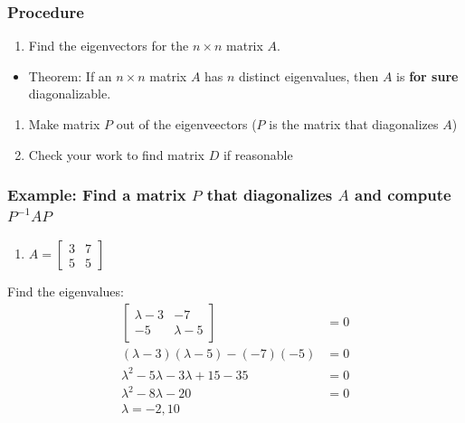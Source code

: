 \documentclass[
  letterpaper,
  DIV=11,
  numbers=noendperiod]{scrartcl}
\providecommand{\tightlist}{%
  \setlength{\itemsep}{0pt}\setlength{\parskip}{0pt}}\usepackage{longtable,booktabs,array}
\begin{document}
\subsubsection{Procedure}\label{procedure}

\begin{enumerate}
\def\labelenumi{\arabic{enumi}.}
\tightlist
\item
  Find the eigenvectors for the \(n \times n\) matrix \(A\).
\end{enumerate}

\begin{itemize}
\tightlist
\item
  Theorem: If an \(n \times n\) matrix \(A\) has \(n\) distinct
  eigenvalues, then \(A\) is \textbf{for sure} diagonalizable.
\end{itemize}

\begin{enumerate}
\def\labelenumi{\arabic{enumi}.}
\setcounter{enumi}{1}
\tightlist
\item
  Make matrix \(P\) out of the eigenveectors (\(P\) is the matrix that
  diagonalizes \(A\))
\item
  Check your work to find matrix \(D\) if reasonable
\end{enumerate}

\subsubsection{\texorpdfstring{Example: Find a matrix \(P\) that
diagonalizes \(A\) and compute
\(P^{-1}AP\)}{Example: Find a matrix P that diagonalizes A and compute P\^{}\{-1\}AP}}\label{example-find-a-matrix-p-that-diagonalizes-a-and-compute-p-1ap}

\begin{enumerate}
\def\labelenumi{\arabic{enumi}.}
\tightlist
\item
  \(A = \begin{bmatrix}3 & 7 \\ 5 & 5 \end{bmatrix}\)
\end{enumerate}

Find the eigenvalues: \begin{align*}
\begin{bmatrix}\lambda-3 & -7 \\ -5 & \lambda-5\end{bmatrix} &= 0 \\
(\lambda-3)(\lambda-5)-(-7)(-5) &= 0 \\
\lambda^2-5\lambda-3\lambda+15-35 &= 0 \\
\lambda^2-8\lambda-20 &= 0 \\
\lambda = -2, 10 
\end{align*}
\end{document}
